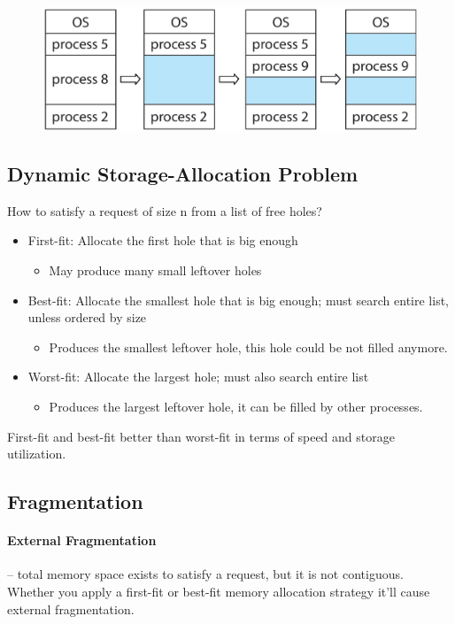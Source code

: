 \begin{figure}[htbp]
    \centering
    \includegraphics[width=0.5\linewidth]{img/jyrt.png}
\end{figure}


\subsection{Dynamic Storage-Allocation Problem}
How to satisfy a request of size n from a list of free holes?

\begin{itemize}
    \item First-fit: Allocate the first hole that is big enough
    \begin{itemize}
        \item[] May produce many small leftover holes
    \end{itemize}

    \item Best-fit: Allocate the smallest hole that is big enough; must search entire list, unless ordered by size 

    \begin{itemize}
        \item[] Produces the smallest leftover hole, this hole could be not filled anymore.
    \end{itemize}

    \item Worst-fit: Allocate the largest hole; must also search entire list 
    \begin{itemize}
        \item[] Produces the largest leftover hole, it can be filled by other processes.
    \end{itemize}
\end{itemize}

First-fit and best-fit better than worst-fit in terms of speed and storage
utilization.
\newpage
\subsection{Fragmentation}

\paragraph{External Fragmentation } – total memory space exists to satisfy a request, but it is not contiguous. Whether you apply a first-fit or best-fit memory allocation strategy it’ll cause external fragmentation.

